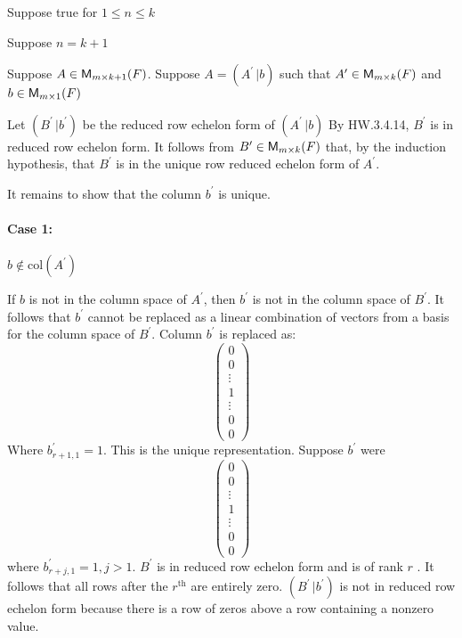 Suppose true for $1\leq n \leq k$

Suppose $n = k+1$

Suppose $A \in \mathsf{M}_{m \times k+1}(F)$. Suppose $A = (A^\prime\,|b)$ such that
$A^\prime \in \mathsf{M}_{m \times k}(F)$ and $ b \in \mathsf{M}_{m \times 1}(F)$

Let $(B^\prime\,|b^\prime)$ be the reduced row echelon form of
$(A^\prime\,|b)$ By HW.3.4.14, $B^\prime$ is in reduced row echelon
form. It follows from $B^\prime \in \mathsf{M}_{m \times k}(F)$ that, by the
induction hypothesis, that $B^\prime$ is in the unique row reduced
echelon form of $A^\prime$.

It remains to show that the column $b^\prime$ is unique.

\paragraph{Case 1:} $b \notin \text{col}(A^\prime)$

If $b$ is not in the column space of $A^\prime$, then $b^\prime$ is not in
the column space of $B^\prime$. It follows that $b^\prime$ cannot be
replaced as a linear combination of vectors from a basis for the
column space of $B^\prime$. Column $b^\prime$ is replaced as:
\begin{equation}
\begin{pmatrix}
0\\0\\\vdots\\1\\\vdots\\0\\0
\end{pmatrix}
\end{equation}
Where $b^\prime_{r+1,1}=1$. This is the unique representation. Suppose
$b^\prime$ were
\begin{equation}
\begin{pmatrix}
0\\0\\\vdots\\1\\\vdots\\0\\0
\end{pmatrix}
\end{equation}
where $b^\prime_{r+j,1}=1, j > 1$. $B^\prime$ is in reduced row
echelon form and is of rank $r$ . It follows that all rows after the
$r^{\text{th}}$ are entirely zero. $(B^\prime\,|b^\prime)$ is not in
reduced row echelon form because there is a row of zeros above a row
containing a nonzero value.
